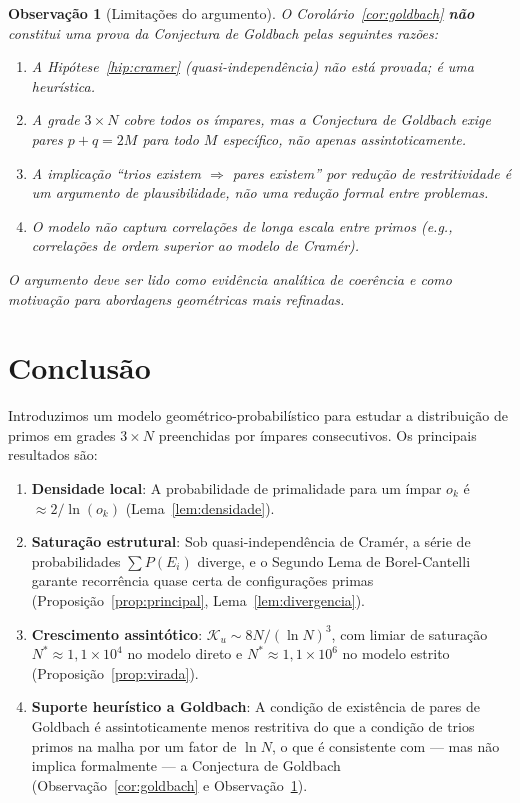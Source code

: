 \documentclass{article}
\newtheorem{remark}[proposition]{Observação}
\begin{document}
	\begin{remark}[Limitações do argumento]
		\label{obs:limitacoes}
		O Corolário~\ref{cor:goldbach} \textbf{não} constitui uma prova
		da Conjectura de Goldbach pelas seguintes razões:
		\begin{enumerate}
			\item A Hipótese~\ref{hip:cramer} (quasi-independência) não está
			provada; é uma heurística.
			\item A grade $3 \times N$ cobre todos os ímpares, mas
			a Conjectura de Goldbach exige pares $p + q = 2M$ para
			\emph{todo} $M$ específico, não apenas assintoticamente.
			\item A implicação ``trios existem $\Rightarrow$ pares existem''
			por redução de restritividade é um argumento de
			\emph{plausibilidade}, não uma redução formal entre problemas.
			\item O modelo não captura correlações de longa escala entre
			primos (e.g., correlações de ordem superior ao modelo de Cramér).
		\end{enumerate}
		O argumento deve ser lido como evidência analítica de coerência
		e como motivação para abordagens geométricas mais refinadas.
	\end{remark}
	
	\section{Conclusão}
	\label{sec:conclusao}
	
	Introduzimos um modelo geométrico-probabilístico para estudar a
	distribuição de primos em grades $3 \times N$ preenchidas por
	ímpares consecutivos. Os principais resultados são:
	
	\begin{enumerate}
		\item \textbf{Densidade local}: A probabilidade de primalidade
		para um ímpar $o_k$ é $\approx 2/\ln(o_k)$
		(Lema~\ref{lem:densidade}).
		
		\item \textbf{Saturação estrutural}: Sob quasi-independência
		de Cramér, a série de probabilidades $\sum P(E_i)$ diverge,
		e o Segundo Lema de Borel-Cantelli garante recorrência quase
		certa de configurações primas (Proposição~\ref{prop:principal},
		Lema~\ref{lem:divergencia}).
		
		\item \textbf{Crescimento assintótico}: $\mathcal{K}_u \sim
		8N/(\ln N)^3$, com limiar de saturação $N^* \approx 1{,}1
		\times 10^4$ no modelo direto e $N^* \approx 1{,}1 \times 10^6$
		no modelo estrito (Proposição~\ref{prop:virada}).
		
		\item \textbf{Suporte heurístico a Goldbach}: A condição de
		existência de pares de Goldbach é assintoticamente menos
		restritiva do que a condição de trios primos na malha por
		um fator de $\ln N$, o que é consistente com — mas não implica
		formalmente — a Conjectura de Goldbach
		(Observação~\ref{cor:goldbach} e Observação~\ref{obs:limitacoes}).
	\end{enumerate}
	
\end{document}
